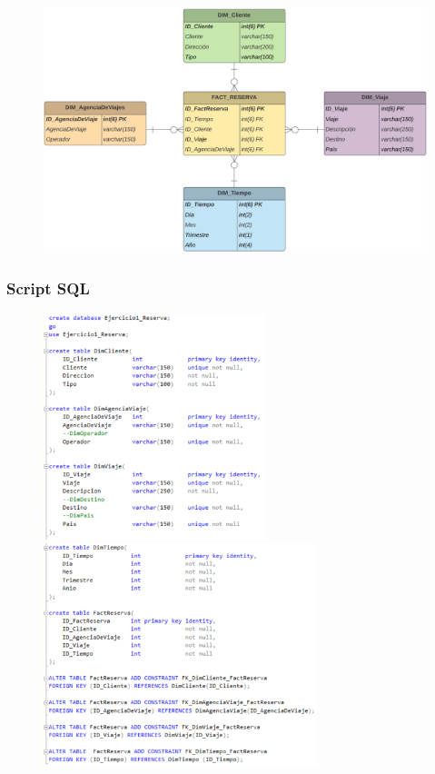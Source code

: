 \documentclass{article}
\begin{document}
	\begin{figure}[htb]
		\begin{center}
			\includegraphics[width=14cm]{./images/mod_dimensional_2}
			
		\end{center}
	\end{figure}

\subsubsection{\textbf{Script SQL }}

	\begin{figure}[htb]
		\begin{center}
			\includegraphics[width=6.5cm]{./images/Ejercicio2_script1}
			\includegraphics[width=8cm]{./images/Ejercicio2_script2}
		\end{center}
	\end{figure}
\end{document}
